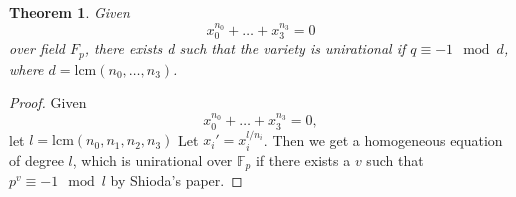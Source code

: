\documentclass{article}
\newcommand{\F}{\mathbb{F}}
\newtheorem{theorem}{Theorem}[section]
\theoremstyle{definition}
\theoremstyle{definition}
\newtheorem{example}[theorem]{Example}
\theoremstyle{remark}
\begin{document}
\begin{theorem}
Given \[x_0^{n_0} + \dots + x_3^{n_3} = 0\] over field $F_p$, there exists d such that the variety is unirational if $q \equiv -1 \mod d$, where $d = \text{lcm}(n_0, \dots, n_3)$.
\end{theorem}
\begin{proof}
Given \[x_0^{n_0} + \dots + x_3^{n_3} = 0,\] let $l = \text{lcm}(n_0, n_1,n_2,n_3)$
Let $x_i' = x_i^{l/n_i}$. Then we get a homogeneous equation of degree $l$, which is unirational over $\F_p$ if there exists a $v$ such that $p^v \equiv -1 \mod l$ by Shioda's paper.
\end{proof}

\begin{comment}
\begin{example}
The automorphism of the weighted projective space $WP_k^n$. Suppose that the weight of this space is $w_0, \dots, w_n$. Then if $\{a_{ij}\}$ is an invertible $(n+1) \times (n+1)$ matrix of elements of a field $k$, then $x_i' = \lambda^{w_i}\sum a_{ij}x_j$ determines an automorphism of the weighted projective space $WP_k^n$, and this automorphism can be written in matrix form as 
\[\begin{bmatrix}
    a_{00} & \dots  & a_{0n} \\
    \vdots & \vdots & \vdots \\
    a_{n0} & \dots  & a_{nn}
\end{bmatrix} \cdot 
\begin{bmatrix}
\lambda^{w_0} & \dots & \lambda^{w_n}
\end{bmatrix}
\]
So we can consider the group $\text{WPGL}(n,k) = \text{GL}(n+1,k)/\begin{bmatrix}
\lambda^{w_0} & \dots & \lambda^{w_n}
\end{bmatrix}k^\ast$.

Consider the points $(1,0,\dots,0), (0,1,\dots,0),\dots, (0,0,\dots, 1),(1,1,\dots, 1)$, we find that if $g \in \text{WPGL}(n,k)$ induces the trivial automorphism, then \[1 = \lambda^{w_i}a_{ii}; \\ \sum_{i\ne j} a_{ij} = 0 \text{ for each fixed } j = 0, \dots, n.\] This means that $g$ is of the form \[\begin{bmatrix}
    1/\lambda^{w_0} & 0 &\dots  & 0 \\
    0 & 1/\lambda^{w_1} & \dots & 0\\
    \vdots & \vdots & \ddots & \vdots\\
    0 & \dots  & \dots & 1/\lambda^{w_n}
\end{bmatrix}
\]
And we know how to count how many element of the group has trivial action. Namely, this number is identical to the number of elements of the form $\begin{bmatrix}
\lambda^{w_0} & \dots & \lambda^{w_n}
\end{bmatrix}$. 
But the problem that the orbit could have different sizes may still remain.

\end{example}
\end{comment}
\end{document}
